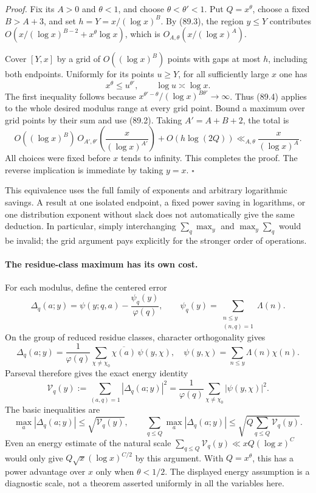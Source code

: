 \documentclass[11pt]{article}
\begin{document}
\emph{Proof.} Fix its $A>0$ and $\theta<1$, and choose
$\theta<\theta'<1$. Put $Q=x^\theta$, choose a fixed $B>A+3$, and set
$h=Y=x/(\log x)^B$. By (89.3), the region $y\leq Y$ contributes
$O(x/(\log x)^{B-2}+x^\theta\log x)$, which is
$O_{A,\theta}(x/(\log x)^A)$.

Cover $[Y,x]$ by a grid of $O((\log x)^B)$ points with gaps at most $h$,
including both endpoints. Uniformly for its points $u\geq Y$, for all
sufficiently large $x$ one has
\[
 x^\theta\leq u^{\theta'},\qquad \log u\asymp\log x.
\]
The first inequality follows because
$x^{\theta'-\theta}/(\log x)^{B\theta'}\to\infty$.
Thus (89.4) applies to the whole desired modulus range at every grid
point. Bound a maximum over grid points by their sum and use (89.2).
Taking $A'=A+B+2$, the total is
\[
 O((\log x)^B)\,O_{A',\theta'}\left(\frac{x}{(\log x)^{A'}}\right)
       +O(h\log(2Q))
                    \ll_{A,\theta}\frac{x}{(\log x)^A}.
\]
All choices were fixed before $x$ tends to infinity. This completes the
proof. The reverse implication is immediate by taking $y=x$.
\hfill$\square$

This equivalence uses the full family of exponents and arbitrary logarithmic
savings. A result at one isolated endpoint, a fixed power saving in logarithms,
or one distribution exponent without slack does not automatically give the
same deduction. In particular, simply interchanging
$\sum_q\max_y$ and $\max_y\sum_q$ would be invalid; the grid argument
pays explicitly for the stronger order of operations.

\paragraph{The residue-class maximum has its own cost.}
For each modulus, define the centered error
\[
 \Delta_q(a;y)=\psi(y;q,a)-\frac{\psi_q(y)}{\varphi(q)},\qquad
 \psi_q(y)=\sum_{\substack{n\leq y\\(n,q)=1}}\Lambda(n).
\]
On the group of reduced residue classes, character orthogonality gives
\[
 \Delta_q(a;y)=\frac1{\varphi(q)}
       \sum_{\chi\ne\chi_0}\overline{\chi(a)}\,\psi(y,\chi),
 \quad \psi(y,\chi)=\sum_{n\leq y}\Lambda(n)\chi(n).
\]
Parseval therefore gives the exact energy identity
\[
 \mathcal V_q(y):=\sum_{(a,q)=1}|\Delta_q(a;y)|^2
       =\frac1{\varphi(q)}\sum_{\chi\ne\chi_0}|\psi(y,\chi)|^2.
                                                               \tag{89.5}
\]
The basic inequalities are
\[
 \max_a|\Delta_q(a;y)|\leq\sqrt{\mathcal V_q(y)},\qquad
 \sum_{q\leq Q}\max_a|\Delta_q(a;y)|
       \leq\sqrt{Q\sum_{q\leq Q}\mathcal V_q(y)}.        \tag{89.6}
\]
Even an energy estimate of the natural scale
$\sum_{q\leq Q}\mathcal V_q(y)\ll xQ(\log x)^C$ would only give
$Q\sqrt x(\log x)^{C/2}$ by this argument. With $Q=x^\theta$, this
has a power advantage over $x$ only when $\theta<1/2$.
The displayed energy assumption is a diagnostic scale, not a theorem
asserted uniformly in all the variables here.
\end{document}
